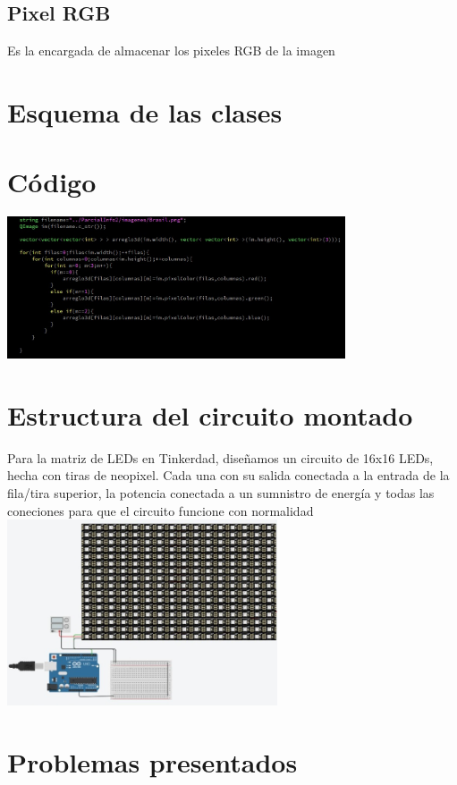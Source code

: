 \documentclass{article}
\begin{document}
\subsection{Pixel RGB}
Es la encargada de almacenar los pixeles RGB de la imagen\\

\section{Esquema de las clases}

\section{Código}
\includegraphics[width=10cm]{Imagenes/Codigo_1.jpeg}


\section{Estructura del circuito montado}
Para la matriz de LEDs en Tinkerdad, diseñamos un circuito de 16x16 LEDs, hecha con tiras de neopixel. Cada una con su salida conectada a la entrada de la fila/tira superior, la potencia conectada a un sumnistro de energía y todas las coneciones para que el circuito funcione con normalidad\\
\includegraphics[width=8cm]{Imagenes/circuito.jpeg}



\section{Problemas presentados}
\end{document}
